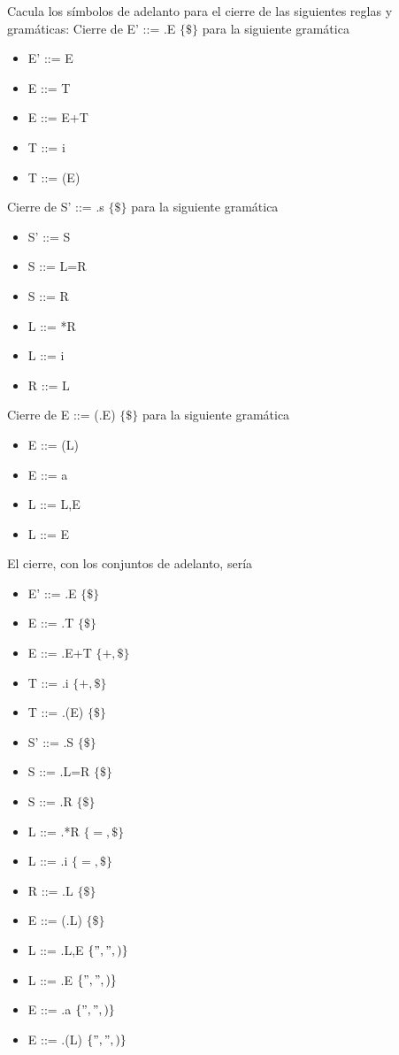 \documentclass[nochap]{apuntes}
\begin{document}
\begin{problem}
Cacula los símbolos de adelanto para el cierre de las siguientes reglas y gramáticas:
\ppart Cierre de E' ::= .E $\{ \$ \}$ para la siguiente gramática
\begin{itemize}
\item E' ::= E
\item E ::= T
\item E ::= E+T
\item T ::= i
\item T ::= (E)
\end{itemize}

\ppart Cierre de S' ::= .s $\{ \$ \}$ para la siguiente gramática
\begin{itemize}
\item S' ::= S
\item S ::= L=R
\item S ::= R
\item L ::= *R
\item L ::= i
\item R ::= L
\end{itemize}

\ppart Cierre de E ::= (.E) $\{ \$ \}$ para la siguiente gramática
\begin{itemize}
\item E ::= (L)
\item E ::= a
\item L ::= L,E
\item L ::= E
\end{itemize}
\solution
\ppart
El cierre, con los conjuntos de adelanto, sería
\begin{itemize}
\item E' ::= .E $\{\$\}$
\item E ::= .T $\{\$\}$
\item E ::= .E+T $\{+,\$\}$
\item T ::= .i $\{+,\$\}$
\item T ::= .(E) $\{\$\}$
\end{itemize}

\ppart
\begin{itemize}
\item S' ::= .S $\{\$\}$
\item S ::= .L=R $\{\$\}$
\item S ::= .R $\{\$\}$
\item L ::= .*R $\{=, \$\}$
\item L ::= .i $\{=, \$\}$
\item R ::= .L $\{\$\}$
\end{itemize}

\ppart
\begin{itemize}
\item E ::= (.L) $\{\$\}$
\item L ::= .L,E $\{",", )\}$
\item L ::= .E $\{",", )\}$
\item E ::= .a $\{",", )\}$
\item E ::= .(L) $\{",", )\}$
\end{itemize}
\end{problem}
\end{document}
